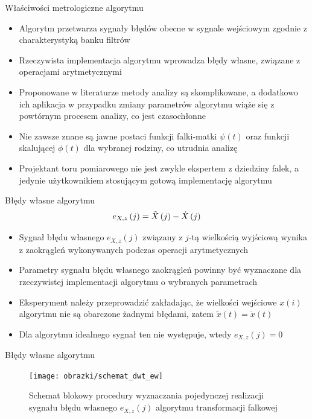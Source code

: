 \documentclass[12pt, polish, aspectratio = 169]{beamer}
\begin{document}
\begin{frame}{Właściwości metrologiczne algorytmu}
\begin{itemize}
\item Algorytm przetwarza sygnały błędów obecne w sygnale wejściowym zgodnie z charakterystyką banku filtrów
\item Rzeczywista implementacja algorytmu wprowadza błędy własne, związane z operacjami arytmetycznymi
\item Proponowane w literaturze metody analizy są skomplikowane, a dodatkowo ich aplikacja w przypadku zmiany parametrów algorytmu wiąże się z powtórnym procesem analizy, co jest czasochłonne
\item Nie zawsze znane są jawne postaci funkcji falki-matki $\psi(t)$ oraz funkcji skalującej $\phi(t)$ dla wybranej rodziny, co utrudnia analizę
\item Projektant toru pomiarowego nie jest zwykle ekspertem z dziedziny falek, a jedynie użytkownikiem stosującym gotową implementację algorytmu
\end{itemize}
\end{frame}

\begin{frame}{Błędy własne algorytmu}
\begin{equation}
e_{X,z} \left(j\right) = \tilde{X} \left(j\right) - \dot{X} \left(j\right) \label{eq:fwt_outerr_self}
\end{equation}
\begin{itemize}
\item Sygnał błędu własnego $e_{X,z}(j)$ związany z $j$-tą wielkością wyjściową wynika z zaokrągleń wykonywanych podczas operacji arytmetycznych
\item Parametry sygnału błędu własnego zaokrągleń powinny być wyznaczane dla rzeczywistej implementacji algorytmu o wybranych parametrach
\item Eksperyment należy przeprowadzić zakładając, że wielkości wejściowe $x(i)$ algorytmu nie są obarczone żadnymi błędami, zatem $\tilde{x}(t) = \dot{x}(t)$
\item Dla algorytmu idealnego sygnał ten nie występuje, wtedy $e_{X,z}(j) = 0$
\end{itemize}
\end{frame}

\begin{frame}{Błędy własne algorytmu}
\begin{figure}
\texttt{[image: obrazki/schemat\_dwt\_ew]}
\caption{Schemat blokowy procedury wyznaczania pojedynczej realizacji sygnału błędu własnego $e_{X,z}(j)$ algorytmu transformacji falkowej}
\end{figure}
\end{frame}
\end{document}
